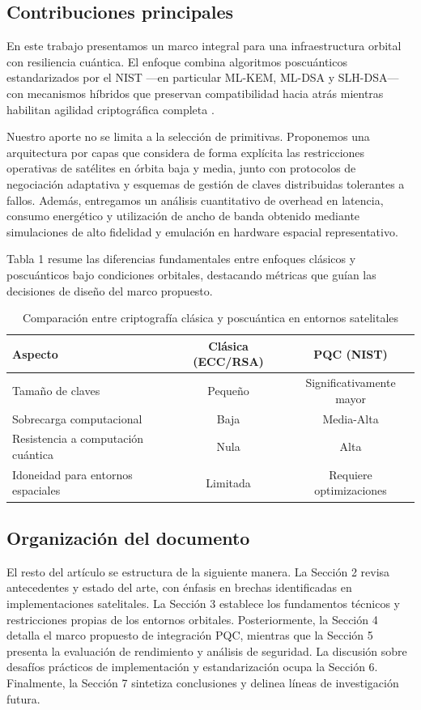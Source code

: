 \subsection{Contribuciones principales}

En este trabajo presentamos un marco integral para una infraestructura orbital con resiliencia cuántica. El enfoque combina algoritmos poscuánticos estandarizados por el NIST —en particular ML-KEM, ML-DSA y SLH-DSA— con mecanismos híbridos que preservan compatibilidad hacia atrás mientras habilitan agilidad criptográfica completa \cite{NIST_PQC2024}. 

Nuestro aporte no se limita a la selección de primitivas. Proponemos una arquitectura por capas que considera de forma explícita las restricciones operativas de satélites en órbita baja y media, junto con protocolos de negociación adaptativa y esquemas de gestión de claves distribuidas tolerantes a fallos. Además, entregamos un análisis cuantitativo de overhead en latencia, consumo energético y utilización de ancho de banda obtenido mediante simulaciones de alto fidelidad y emulación en hardware espacial representativo.

Tabla 1 resume las diferencias fundamentales entre enfoques clásicos y poscuánticos bajo condiciones orbitales, destacando métricas que guían las decisiones de diseño del marco propuesto.

\begin{table}[t]
\centering
\caption{Comparación entre criptografía clásica y poscuántica en entornos satelitales}
\label{tab:comparacion_pqc}
\begin{tabular}{lcc}
\hline
\textbf{Aspecto} & \textbf{Clásica (ECC/RSA)} & \textbf{PQC (NIST)} \\
\hline
Tamaño de claves & Pequeño & Significativamente mayor \\
Sobrecarga computacional & Baja & Media-Alta \\
Resistencia a computación cuántica & Nula & Alta \\
Idoneidad para entornos espaciales & Limitada & Requiere optimizaciones \\
\hline
\end{tabular}
\end{table}

\subsection{Organización del documento}

El resto del artículo se estructura de la siguiente manera. La Sección 2 revisa antecedentes y estado del arte, con énfasis en brechas identificadas en implementaciones satelitales. La Sección 3 establece los fundamentos técnicos y restricciones propias de los entornos orbitales. Posteriormente, la Sección 4 detalla el marco propuesto de integración PQC, mientras que la Sección 5 presenta la evaluación de rendimiento y análisis de seguridad. La discusión sobre desafíos prácticos de implementación y estandarización ocupa la Sección 6. Finalmente, la Sección 7 sintetiza conclusiones y delinea líneas de investigación futura.